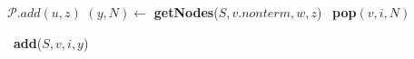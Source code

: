 \begin{algorithmic}   
        \State $\mathcal{P}.add(u,z)$
            \State $(y,N) \gets$ \textbf{getNodes}($S, v.nonterm, w, z$)
                \ \textbf{pop}$(v,i,N)$ 
            \EndIf
            
                \ \textbf{add}($S,v,i,y$)
            \EndIf
        \EndFor
    \EndIf
\EndFunction
\end{algorithmic}